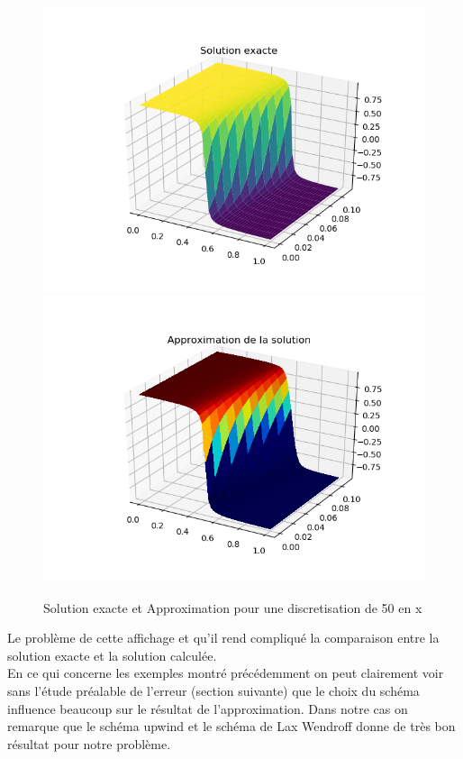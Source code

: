 \documentclass[12pt]{article}
\begin{document}
 \begin{figure}[H]
	\centering
	\includegraphics[scale=0.5]{1d_form3d_init2_s1_cfl0-5_exact.png}
	\includegraphics[scale=0.5]{1d_form3d_init2_s1_cfl0-5_appro.png}
	\caption{Solution exacte et Approximation pour une discretisation de 50 en x}
	\label{1D}
	\end{figure}
Le problème de cette affichage et qu'il rend compliqué la comparaison entre la solution exacte et la solution calculée.
\\En ce qui concerne les exemples montré précédemment on peut clairement voir sans l'étude préalable de l'erreur (section suivante) que le choix du schéma influence beaucoup sur le résultat de l'approximation. Dans notre cas on remarque que le schéma upwind et le schéma de Lax Wendroff donne de très bon résultat pour notre problème.
\end{document}
